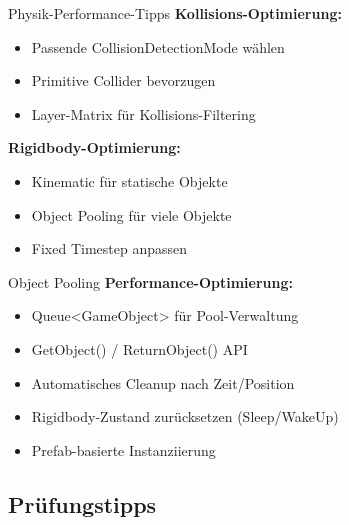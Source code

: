 \begin{concept}{Physik-Performance-Tipps}
    \textbf{Kollisions-Optimierung:}
    \begin{itemize}
        \item Passende CollisionDetectionMode wählen
        \item Primitive Collider bevorzugen
        \item Layer-Matrix für Kollisions-Filtering
    \end{itemize}
    
    \textbf{Rigidbody-Optimierung:}
    \begin{itemize}
        \item Kinematic für statische Objekte
        \item Object Pooling für viele Objekte
        \item Fixed Timestep anpassen
    \end{itemize}
\end{concept}

\begin{concept}{Object Pooling}
    \textbf{Performance-Optimierung:}
    \begin{itemize}
        \item Queue<GameObject> für Pool-Verwaltung
        \item GetObject() / ReturnObject() API
        \item Automatisches Cleanup nach Zeit/Position
        \item Rigidbody-Zustand zurücksetzen (Sleep/WakeUp)
        \item Prefab-basierte Instanziierung
    \end{itemize}
\end{concept}

\subsection{Prüfungstipps}

